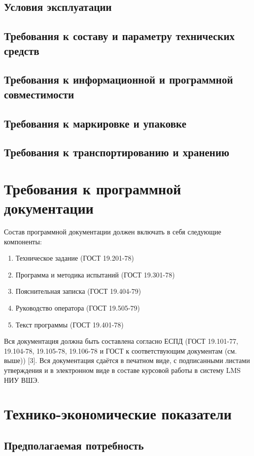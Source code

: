 \documentclass[a4paper,12pt]{article}
\begin{document}
	\subsection{Условия эксплуатации}
	\subsection{Требования к составу и параметру технических средств}
	\subsection{Требования к информационной и программной совместимости}
	\subsection{Требования к маркировке и упаковке}
	\subsection{Требования к транспортированию и хранению}
	
						\newpage
	\section{Требования к программной документации}
	Состав программной документации должен включать в себя следующие компоненты:
	\begin{enumerate}
		\item Техническое задание (ГОСТ 19.201-78)
		\item Программа и методика испытаний (ГОСТ 19.301-78)
		\item Пояснительная записка (ГОСТ 19.404-79)
		\item Руководство оператора (ГОСТ 19.505-79)
		\item Текст программы (ГОСТ 19.401-78)
	\end{enumerate}
	Вся документация должна быть составлена согласно ЕСПД (ГОСТ 19.101-77, 19.104-78, 19.105-78, 19.106-78 и ГОСТ к соответствующим документам (см. выше)) [3]. Вся документация сдаётся в печатном виде, с подписанными листами утверждения и в электронном виде в составе курсовой работы в систему LMS НИУ ВШЭ. 
	
						\newpage
	\section{Технико-экономические показатели}
	\subsection{Предполагаемая потребность}
\end{document}
